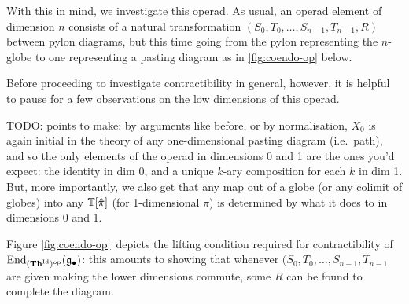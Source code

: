 With this in mind, we investigate this operad.  As usual, an operad element of dimension $n$ consists of a natural transformation $(S_0,T_0,\ldots,S_{n-1},T_{n-1},R)$ between pylon diagrams, but this time going from the pylon representing the $n$-globe to one representing a pasting diagram as in \ref{fig:coendo-op} below.

Before proceeding to investigate contractibility in general, however, it is helpful to pause for a few observations on the low dimensions of this operad.

TODO: points to make: by arguments like before, or by normalisation, $X_0$ is again initial in the theory of any one-dimensional pasting diagram (i.e.\ path), and so the only elements of the operad in dimensions 0 and 1 are the ones you'd expect: the identity in dim 0, and a unique $k$-ary composition for each $k$ in dim 1.  But, more importantly, we also get that any map out of a globe (or any colimit of globes) into any $\mathbb{T}[\hat \pi]$ (for 1-dimensional $\pi$) is determined by what it does to in dimensions 0 and 1.


\para[Contractibility]  Figure \ref{fig:coendo-op}\ depicts the lifting condition required for contractibility of $\mathrm{End}_{(\mathbf{Th}^{\mathrm{Id}})^{\mathrm{op}}}(\mathfrak{g}_\bullet)$: this amounts to showing that whenever $(S_0,T_0,\ldots,S_{n-1},T_{n-1}$ are given making the lower dimensions commute, some $R$ can be found to complete the diagram.

